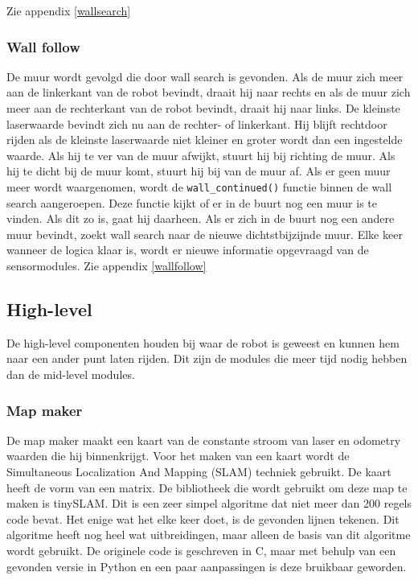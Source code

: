 \documentclass[a4paper,10pt]{article}
\begin{document}
Zie appendix \ref{wallsearch}

\subsubsection{Wall follow}
De muur wordt gevolgd die door wall search is gevonden. Als de muur zich meer aan de linkerkant van de robot bevindt, draait hij naar rechts en als de muur zich meer aan de rechterkant van de robot bevindt, draait hij naar links. De kleinste laserwaarde bevindt zich nu aan de rechter- of linkerkant. Hij blijft rechtdoor rijden als de kleinste laserwaarde niet kleiner en groter wordt dan een ingestelde waarde. Als hij te ver van de muur afwijkt, stuurt hij bij richting de muur. Als hij te dicht bij de muur komt, stuurt hij bij van de muur af. Als er geen muur meer wordt waargenomen, wordt de \verb!wall_continued()! functie binnen de wall search aangeroepen. Deze functie kijkt of er in de buurt nog een muur is te vinden. Als dit zo is, gaat hij daarheen. Als er zich in de buurt nog een andere muur bevindt, zoekt wall search naar de nieuwe dichtstbijzijnde muur. Elke keer wanneer de logica klaar is, wordt er nieuwe informatie opgevraagd van de sensormodules.
Zie appendix \ref{wallfollow}

\subsection{High-level}
De high-level componenten houden bij waar de robot is geweest en kunnen hem naar een ander punt laten rijden. Dit zijn de modules die meer tijd nodig hebben dan de mid-level modules.

\subsubsection{Map maker}
De map maker maakt een kaart van de constante stroom van laser en odometry waarden die hij binnenkrijgt. Voor het maken van een kaart wordt de Simultaneous Localization And Mapping (SLAM) techniek gebruikt. De kaart heeft de vorm van een matrix.
De bibliotheek die wordt gebruikt om deze map te maken is tinySLAM. Dit is een zeer simpel algoritme dat niet meer dan 200 regels code bevat. Het enige wat het elke keer doet, is de gevonden lijnen tekenen. Dit algoritme heeft nog heel wat uitbreidingen, maar alleen de basis van dit algoritme wordt gebruikt. De originele code is geschreven in C, maar met behulp van een gevonden versie in Python en een paar aanpassingen is deze bruikbaar geworden.
\end{document}
